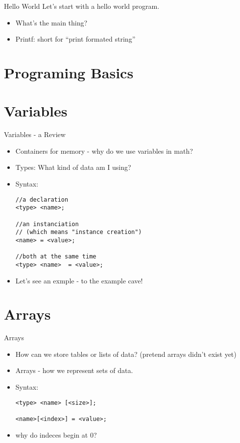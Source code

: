 \documentclass[main.tex]{subfile}
\begin{document}
\begin{frame}{Hello World}
	Let's start with a hello world program.
	\begin{itemize}
		\item What's the main thing?
		\item Printf: short for ``print formated string''
	\end{itemize}
\end{frame}


\section{Programing Basics} 
\label{sec:programing_basics}

\section{Variables}
\label{sec:variables_scope_and_arrays}

\begin{frame}[fragile]{Variables - a Review}
	\begin{itemize}
		\item Containers for memory - why do we use variables in math?
		\item Types: What kind of data am I using?
		\item Syntax:
			\begin{lstlisting}
//a declaration
<type> <name>; 

//an instanciation 
// (which means "instance creation")
<name> = <value>;

//both at the same time
<type> <name>  = <value>;
			\end{lstlisting}
		\item Let's see an exmple - to the example cave!
	\end{itemize}
\end{frame}


\section{Arrays}
\label{sec:arrays}

\begin{frame}[fragile]{Arrays}
	\begin{itemize}
		\item How can we store tables or lists of data? (pretend arrays didn't exist
			yet)
		\item Arrays - how we represent sets of data.
		\item Syntax:
			\begin{lstlisting}
<type> <name> [<size>];

<name>[<index>] = <value>;
			\end{lstlisting}
		\item why do indeces begin at 0?
	\end{itemize}
\end{frame}
\end{document}

